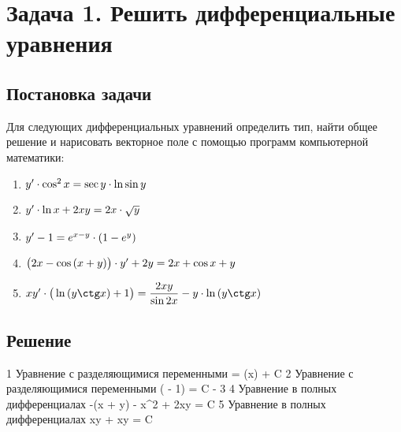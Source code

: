 

\section{Задача 1. Решить дифференциальные уравнения}
\subsection{Постановка задачи}
Для следующих дифференциальных уравнений определить тип, найти общее
решение и нарисовать векторное поле с помощью программ компьютерной математики:

\begin{enumerate}[label={}]                                                 
	\item $ {y}' \cdot \cos^{2}{x} = \sec{y} \cdot \ln{\sin{y}} $          
	\item $ {y}' \cdot \ln{x} + 2xy = 2x \cdot \sqrt{y} $
	\item $ {y}' - 1 = e^{x-y} \cdot (1 - e^{y}) $                             
	\item $ \big(2x - \cos{(x + y)} \big) \cdot {y}' + 2y = 2{x} + \cos{x + y} $
	\item $ \equationFifth $
\end{enumerate}

\newpage
\subsection{Решение}
\begin{enumerate}
	\taskOneSolutionItem
		{1}
		{\equationFirst}
		{Уравнение с разделяющимися переменными}
		{ = \tan(x) + {C}}
	\taskOneSolutionItem
		{2}
		{\equationSecond}
		{Уравнение с разделяющимися переменными}
		{\ln( - 1) = C - }
	\taskOneSolutionItem
		{3}
		{\equationThird}
		{}
		{}
	\taskOneSolutionItem
		{4}
		{\equationFourth}
		{Уравнение в полных дифференциалах}
		{-\sin(x + y) - {x}^2 + 2xy = C}
	\taskOneSolutionItem
		{5}
		{\equationFifth}
		{Уравнение в полных дифференциалах}
		{xy + xy = C}
\end{enumerate}

